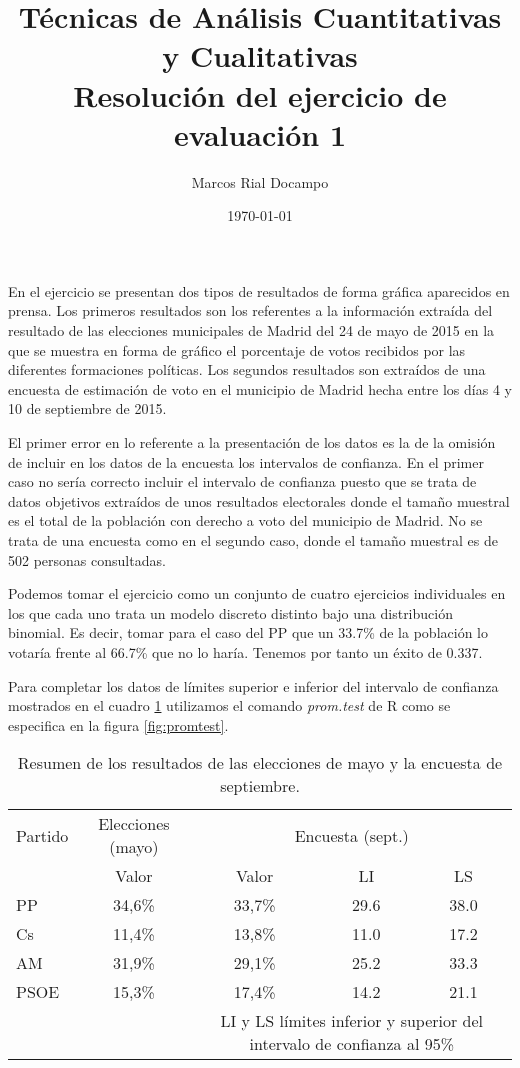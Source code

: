 \documentclass[11pt,a4paper]{article}
\author{Marcos Rial Docampo}
\title{Técnicas de Análisis Cuantitativas y Cualitativas\\Resolución del ejercicio de evaluación 1}
\date{\small{\today}}
\begin{document}
\maketitle

En el ejercicio se presentan dos tipos de resultados de forma gráfica aparecidos en prensa. Los primeros resultados son los referentes a la información extraída del resultado de las elecciones municipales de Madrid del 24 de mayo de 2015 en la que se muestra en forma de gráfico el porcentaje de votos recibidos por las diferentes formaciones políticas. Los segundos resultados son extraídos de una encuesta de estimación de voto en el municipio de Madrid hecha entre los días 4 y 10 de septiembre de 2015.

El primer error en lo referente a la presentación de los datos es la de la omisión de incluir en los datos de la encuesta los intervalos de confianza. En el primer caso no sería correcto incluir el intervalo de confianza puesto que se trata de datos objetivos extraídos de unos resultados electorales donde el tamaño muestral es el total de la población con derecho a voto del municipio de Madrid. No se trata de una encuesta como en el segundo caso, donde el tamaño muestral es de 502 personas consultadas.

Podemos tomar el ejercicio como un conjunto de cuatro ejercicios individuales en los que cada uno trata un modelo discreto distinto bajo una distribución binomial. Es decir, tomar para el caso del PP que un 33.7\% de la población lo votaría frente al 66.7\% que no lo haría. Tenemos por tanto un éxito de 0.337.

Para completar los datos de límites superior e inferior del intervalo de confianza mostrados en el cuadro \ref{tab:resumen} utilizamos el comando \textit{prom.test} de R como se especifica en la figura \ref{fig:promtest}.

\begin{table}
	\centering
	\begin{tabular}{lcccc}
	\toprule[0.4mm]
	Partido & Elecciones (mayo) & \multicolumn{3}{c}{Encuesta (sept.)}\\
	& Valor & Valor & LI & LS \\
	\midrule
	PP & 34,6\% & 33,7\% & 29.6 & 38.0 \\
	Cs & 11,4\% & 13,8\% & 11.0 & 17.2 \\
	AM & 31,9\% & 29,1\% & 25.2 & 33.3 \\
	PSOE & 15,3\% & 17,4\% & 14.2 & 21.1 \\
	\bottomrule[0.4mm]
	& & \multicolumn{3}{p{3.4cm}}{\footnotesize{LI y LS límites inferior y superior del intervalo de confianza al 95\%}}
	\end{tabular}
	\caption{Resumen de los resultados de las elecciones de mayo y la encuesta de septiembre.}
\label{tab:resumen}
\end{table}
\end{document}
